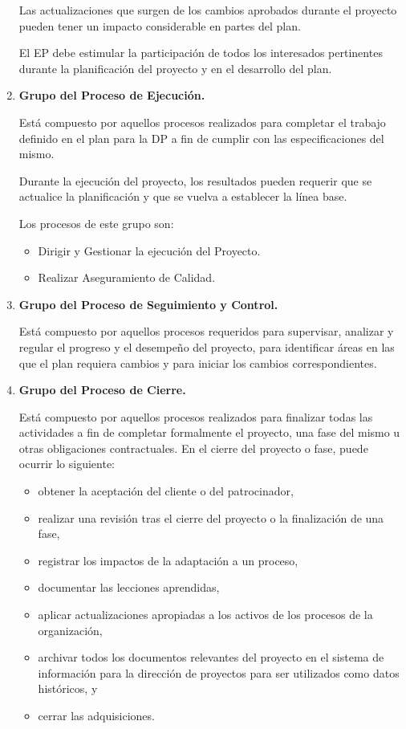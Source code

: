 \documentclass[10pt,a4paper]{article}
\begin{document}
\begin{enumerate}
Las actualizaciones que surgen de los cambios aprobados durante el proyecto pueden tener un impacto considerable en partes del plan.

El EP debe estimular la participación de todos los interesados pertinentes durante la planificación del proyecto y en el desarrollo del plan.

\item \textbf{Grupo del Proceso de Ejecución.}

Está compuesto por aquellos procesos realizados para completar el trabajo definido en el plan para la DP a fin de cumplir con las especificaciones del mismo.

Durante la ejecución del proyecto, los resultados pueden requerir que se actualice la planificación y que se vuelva a establecer la línea base.

Los procesos de este grupo son:
\begin{itemize}
\item Dirigir y Gestionar la ejecución del Proyecto.
\item Realizar Aseguramiento de Calidad.
\end{itemize}

\item \textbf{Grupo del Proceso de Seguimiento y Control.}

Está compuesto por aquellos procesos requeridos para supervisar, analizar y regular el progreso y el desempeño del proyecto, para identificar áreas en las que el plan requiera cambios y para iniciar los cambios correspondientes.

\item \textbf{Grupo del Proceso de Cierre.}

Está compuesto por aquellos procesos realizados para finalizar todas las actividades a fin de completar formalmente el proyecto, una fase del mismo u otras obligaciones contractuales. En el cierre del proyecto o fase, puede ocurrir lo siguiente:
\begin{itemize}
\item obtener la aceptación del cliente o del patrocinador,
\item realizar una revisión tras el cierre del proyecto o la finalización de una fase,
\item registrar los impactos de la adaptación a un proceso,
\item documentar las lecciones aprendidas,
\item aplicar actualizaciones apropiadas a los activos de los procesos de la organización,
\item archivar todos los documentos relevantes del proyecto en el sistema de información para la dirección de proyectos para ser utilizados como datos históricos, y
\item cerrar las adquisiciones.
\end{itemize}
\end{enumerate}
\end{document}
